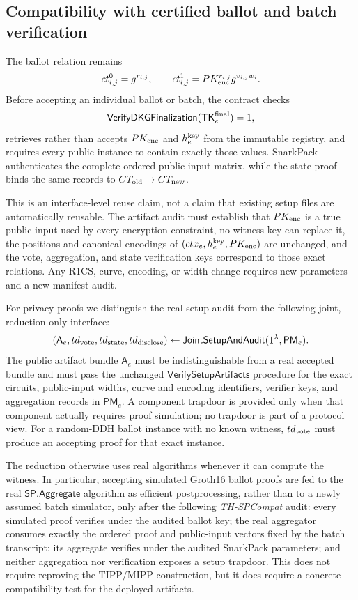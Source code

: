 \documentclass[pdflatex,sn-mathphys-num]{sn-jnl}%
\theoremstyle{thmstyleone}%
\theoremstyle{thmstyletwo}%
\theoremstyle{thmstylethree}%
\begin{document}
\subsection{Compatibility with certified ballot and batch verification}
\label{subsec:threshold-compatibility}

The ballot relation remains
\[
 ct_{i,j}^{0}=g^{r_{i,j}},\qquad
 ct_{i,j}^{1}=PK_{\rm enc}^{r_{i,j}}g^{v_{i,j}w_i}.
\]
Before accepting an individual ballot or batch, the contract checks
\[
 \mathsf{VerifyDKGFinalization}(\mathsf{TK}_e^{\rm final})=1,
\]
retrieves rather than accepts $PK_{\rm enc}$ and $h_e^{\rm key}$ from the
immutable registry, and requires every public instance to contain exactly
those values.  SnarkPack authenticates the complete ordered public-input
matrix, while the state proof binds the same records to
$CT_{\rm old}\rightarrow CT_{\rm new}$.

This is an interface-level reuse claim, not a claim that existing setup files
are automatically reusable.  The artifact audit must establish that
$PK_{\rm enc}$ is a true public input used by every encryption constraint, no
witness key can replace it, the positions and canonical encodings of
$(ctx_e,h_e^{\rm key},PK_{\rm enc})$ are unchanged, and the vote,
aggregation, and state verification keys correspond to those exact relations.
Any R1CS, curve, encoding, or width change requires new parameters and a new
manifest audit.

For privacy proofs we distinguish the real setup audit from the following
joint, reduction-only interface:
\[
 (\mathsf A_e,td_{\rm vote},td_{\rm state},td_{\rm disclose})
 \leftarrow\mathsf{JointSetupAndAudit}(1^\lambda,\mathsf{PM}_e).
\]
The public artifact bundle $\mathsf A_e$ must be indistinguishable from a real
accepted bundle and must pass the unchanged
$\mathsf{VerifySetupArtifacts}$ procedure for the exact circuits, public-input
widths, curve and encoding identifiers, verifier keys, and aggregation records
in $\mathsf{PM}_e$.  A component trapdoor is provided only when that component
actually requires proof simulation; no trapdoor is part of a protocol view.
For a random-DDH ballot instance with no known witness,
$td_{\rm vote}$ must produce an accepting proof for that exact instance.

The reduction otherwise uses real algorithms whenever it can compute the
witness.  In particular, accepting simulated Groth16 ballot proofs are fed to
the real $\mathsf{SP.Aggregate}$ algorithm as efficient postprocessing, rather
than to a newly assumed batch simulator, only after the following
\emph{TH-SPCompat} audit: every simulated proof verifies under the audited
ballot key; the real aggregator consumes exactly the ordered proof and
public-input vectors fixed by the batch transcript; its aggregate verifies
under the audited SnarkPack parameters; and neither aggregation nor
verification exposes a setup trapdoor.  This does not require reproving the
TIPP/MIPP construction, but it does require a concrete compatibility test for
the deployed artifacts.
\end{document}
